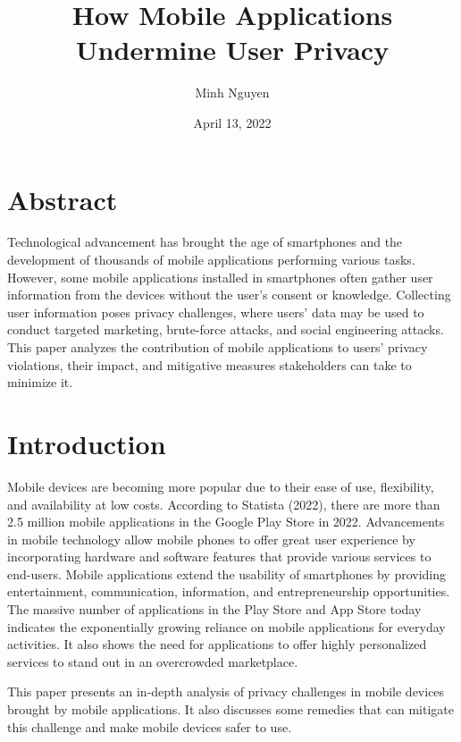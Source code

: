 \documentclass{article}
\title{How Mobile Applications Undermine User Privacy}
\author{Minh Nguyen}
\date{April 13, 2022}
\begin{document}
\maketitle

\section*{Abstract}
Technological advancement has brought the age of smartphones and the development of thousands of mobile applications performing various tasks. However, some mobile applications installed in smartphones often gather user information from the devices without the user’s consent or knowledge. Collecting user information poses privacy challenges, where users’ data may be used to conduct targeted marketing, brute-force attacks, and social engineering attacks. This paper analyzes the contribution of mobile applications to users’ privacy violations, their impact, and mitigative measures stakeholders can take to minimize it.


\medskip

\section*{Introduction}
Mobile devices are becoming more popular due to their ease of use, flexibility, and availability at low costs. According to Statista (2022), there are more than 2.5 million mobile applications in the Google Play Store in 2022. Advancements in mobile technology allow mobile phones to offer great user experience by incorporating hardware and software features that provide various services to end-users. Mobile applications extend the usability of smartphones by providing entertainment, communication, information, and entrepreneurship opportunities. The massive number of applications in the Play Store and App Store today indicates the exponentially growing reliance on mobile applications for everyday activities. It also shows the need for applications to offer highly personalized services to stand out in an overcrowded marketplace.


\medskip

This paper presents an in-depth analysis of privacy challenges in mobile devices brought by mobile applications. It also discusses some remedies that can mitigate this challenge and make mobile devices safer to use. 



\medskip
\end{document}
